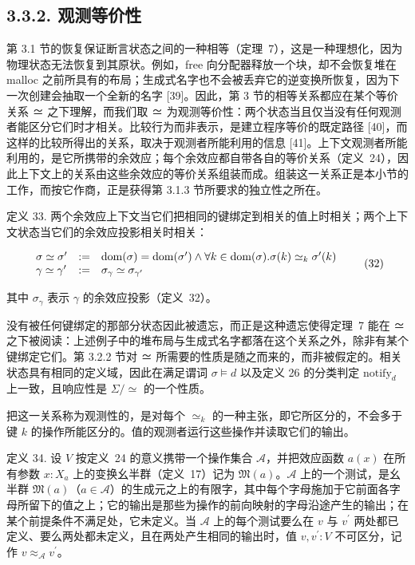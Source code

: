 \subsection{3.3.2. 观测等价性}\label{observational-equivalence}

第 3.1 节的恢复保证断言状态之间的一种相等（定理~7），这是一种理想化，因为物理状态无法恢复到其原状。例如，free 向分配器释放一个块，却不会恢复堆在 malloc 之前所具有的布局；生成式名字也不会被丢弃它的逆变换所恢复，因为下一次创建会抽取一个全新的名字 [39]。因此，第 3 节的相等关系都应在某个等价关系 ≃ 之下理解，而我们取 ≃ 为观测等价性：两个状态当且仅当没有任何观测者能区分它们时才相关。比较行为而非表示，是建立程序等价的既定路径 [40]，而这样的比较所得出的关系，取决于观测者所能利用的信息 [41]。上下文观测者所能利用的，是它所携带的余效应；每个余效应都自带各自的等价关系（定义~24），因此上下文上的关系由这些余效应的等价关系组装而成。组装这一关系正是本小节的工作，而按它作商，正是获得第 3.1.3 节所要求的独立性之所在。

定义 33. 两个余效应上下文当它们把相同的键绑定到相关的值上时相关；两个上下文状态当它们的余效应投影相关时相关：

\[
\begin{array} { l l l } { { \sigma \simeq \sigma ^ { \prime } } } & { { : = } } & { { \mathrm { d o m } ( \sigma ) = \mathrm { d o m } ( \sigma ^ { \prime } ) \wedge \forall k \in \mathrm { d o m } ( \sigma ) . \sigma ( k ) \simeq _ { k } \sigma ^ { \prime } ( k ) } } \\ { { \gamma \simeq \gamma ^ { \prime } } } & { { : = } } & { { \sigma _ { \gamma } \simeq \sigma _ { \gamma ^ { \prime } } } } \end{array}\tag{32}
\]

其中 \(\sigma _ { \gamma }\) 表示 \(\gamma\) 的余效应投影（定义~32）。

没有被任何键绑定的那部分状态因此被遗忘，而正是这种遗忘使得定理~7 能在 ≃ 之下被阅读：上述例子中的堆布局与生成式名字都落在这个关系之外，除非有某个键绑定它们。第 3.2.2 节对 ≃ 所需要的性质是随之而来的，而非被假定的。相关状态具有相同的定义域，因此在满足谓词 \(\sigma \models d\) 以及定义 26 的分类判定 \(\mathrm { notify } _ { d }\) 上一致，且响应性是 \(\Sigma / \simeq\) 的一个性质。

把这一关系称为观测性的，是对每个 \(\simeq _ { k }\) 的一种主张，即它所区分的，不会多于键 \(k\) 的操作所能区分的。值的观测者运行这些操作并读取它们的输出。

定义 34. 设 \(V\) 按定义~24 的意义携带一个操作集合 \(\mathcal{A}\)，并把效应函数 \(a ( x )\) 在所有参数 \(x : X _ { a }\) 上的变换幺半群（定义~17）记为 \(\mathfrak { M } ( a )\)。\(\mathcal{A}\) 上的一个测试，是幺半群 \(\mathfrak { M } ( a )\)（\(a \in \mathcal { A }\)）的生成元之上的有限字，其中每个字母施加于它前面各字母所留下的值之上；它的输出是那些为操作的前向映射的字母沿途产生的输出；在某个前提条件不满足处，它未定义。当 \(\mathcal{A}\) 上的每个测试要么在 \(v\) 与 \(v ^ { \prime }\) 两处都已定义、要么两处都未定义，且在两处产生相同的输出时，值 \(v , v ^ { \prime } : V\) 不可区分，记作 \(v \approx _ { \mathcal { A } } v ^ { \prime }\)。

